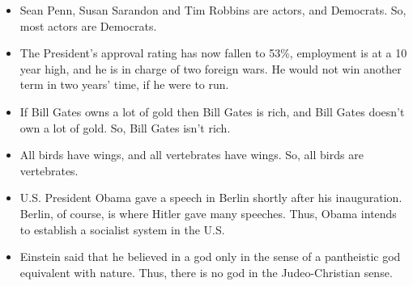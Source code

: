 \begin{itemize}

\item Sean Penn, Susan Sarandon and Tim Robbins are actors, and Democrats. So, most actors are Democrats.



\item  The President's approval rating has now fallen to 53\%, employment is at a 10 year high, and he is in charge of two foreign wars. He would not win another term in two years' time, if he were to run.



\item If Bill Gates owns a lot of gold then Bill Gates is rich, and Bill Gates doesn't own a lot of gold. So, Bill Gates isn't rich.


\item All birds have wings, and all vertebrates have wings. So, all birds are vertebrates.


\item U.S. President Obama gave a speech in Berlin shortly after his inauguration. Berlin, of course, is where Hitler gave many speeches. Thus, Obama intends to establish a socialist system in the U.S.


\item Einstein said that he believed in a god only in the sense of a pantheistic god equivalent with nature. Thus, there is no god in the Judeo-Christian sense.


\end{itemize}
